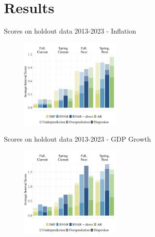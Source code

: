 \documentclass[en]{sdqbeamer}
\begin{document}
\section{Results}
\begin{frame}{Scores on holdout data 2013-2023 - Inflation}
    \begin{figure}
        \centering
        \includegraphics[width=0.45\textwidth]{figures/ho_wis_pcpi_pch_absolute_rollingwindow.pdf} 
        \label{fig:enter-label}
    \end{figure} 
\end{frame}

\begin{frame}{Scores on holdout data 2013-2023 - GDP Growth}
    \begin{figure}
        \centering
        \includegraphics[width=0.45\textwidth]{figures/ho_wis_ngdp_rpch_absolute_rollingwindow.pdf} 
        \label{fig:enter-label}
    \end{figure} 
\end{frame}
\end{document}
